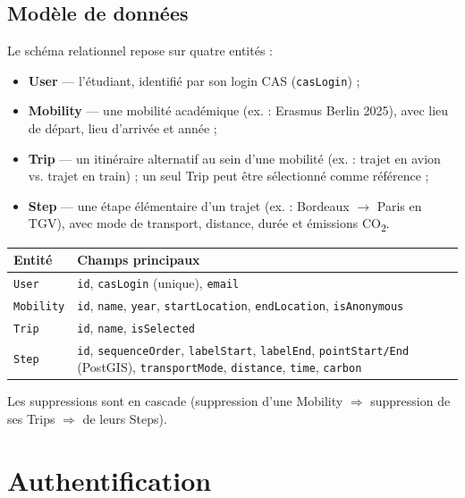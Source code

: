 \documentclass[11pt,a4paper]{article}
\begin{document}
\subsection{Modèle de données}

Le schéma relationnel repose sur quatre entités :

\begin{itemize}
  \item \textbf{User} — l'étudiant, identifié par son login CAS (\texttt{casLogin}) ;
  \item \textbf{Mobility} — une mobilité académique (ex. : \og Erasmus Berlin 2025\fg{}), avec lieu de départ, lieu d'arrivée et année ;
  \item \textbf{Trip} — un itinéraire alternatif au sein d'une mobilité (ex. : \og trajet en avion\fg{} vs. \og trajet en train\fg{}) ; un seul Trip peut être \og sélectionné\fg{} comme référence ;
  \item \textbf{Step} — une étape élémentaire d'un trajet (ex. : Bordeaux $\to$ Paris en TGV), avec mode de transport, distance, durée et émissions CO\textsubscript{2}.
\end{itemize}

\begin{center}
\begin{tabular}{p{2.8cm}p{9.5cm}}
\toprule
\textbf{Entité} & \textbf{Champs principaux} \\
\midrule
\texttt{User} & \texttt{id}, \texttt{casLogin} (unique), \texttt{email} \\
\texttt{Mobility} & \texttt{id}, \texttt{name}, \texttt{year}, \texttt{startLocation}, \texttt{endLocation}, \texttt{isAnonymous} \\
\texttt{Trip} & \texttt{id}, \texttt{name}, \texttt{isSelected} \\
\texttt{Step} & \texttt{id}, \texttt{sequenceOrder}, \texttt{labelStart}, \texttt{labelEnd}, \texttt{pointStart/End} (PostGIS), \texttt{transportMode}, \texttt{distance}, \texttt{time}, \texttt{carbon} \\
\bottomrule
\end{tabular}
\end{center}

Les suppressions sont en cascade (suppression d'une Mobility $\Rightarrow$ suppression de ses Trips $\Rightarrow$ de leurs Steps).

\newpage
\section{Authentification}
\end{document}
